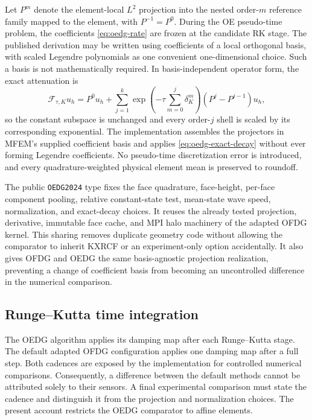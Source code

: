 Let $P^m$ denote the element-local $L^2$ projection into the nested order-$m$ reference family mapped to the element,
with $P^{-1}=P^0$.  During the OE pseudo-time problem, the coefficients
\cref{eq:oedg-rate} are frozen at the candidate RK stage.  The published
derivation may be written using coefficients of a local orthogonal basis, with
scaled Legendre polynomials as one convenient one-dimensional choice.  Such a
basis is not mathematically required.  In basis-independent operator form, the
exact attenuation is
\begin{equation}
  \mathcal F_{\tau,K}u_h
  =P^0u_h
   +\sum_{j=1}^{k}
    \exp\!\left(-\tau\sum_{m=0}^{j}\delta_K^m\right)
    \left(P^j-P^{j-1}\right)u_h,
  \label{eq:oedg-exact-decay}
\end{equation}
so the constant subspace is unchanged and every order-$j$ shell is
scaled by its corresponding exponential.  The implementation assembles the
projectors in MFEM's supplied coefficient basis and applies
\cref{eq:oedg-exact-decay} without ever forming Legendre coefficients.  No
pseudo-time discretization error is introduced, and every quadrature-weighted physical element mean is
preserved to roundoff.

The public \texttt{OEDG2024} type fixes the face quadrature, face-height,
per-face component pooling, relative constant-state test, mean-state wave
speed, normalization, and exact-decay choices.  It
reuses the already tested projection, derivative, immutable face cache, and MPI
halo machinery of the adapted OFDG kernel.  This sharing removes duplicate
geometry code without allowing the comparator to inherit KXRCF or an
experiment-only option accidentally.  It also gives OFDG and OEDG the same
basis-agnostic projection realization, preventing a change of coefficient basis
from becoming an uncontrolled difference in the numerical comparison.

\subsection{Runge--Kutta time integration}

The OEDG algorithm applies its damping map after each Runge--Kutta stage.
The default adapted OFDG configuration applies one damping map after a full
step. Both cadences are exposed by the implementation for controlled numerical
comparisons. Consequently, a difference between the default methods cannot
be attributed solely to their sensors. A final experimental comparison must
state the cadence and distinguish it from the projection and normalization
choices. The present account restricts the OEDG comparator to affine elements.
